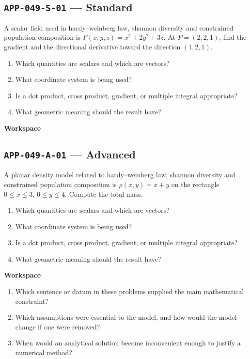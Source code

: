 \documentclass[11pt]{book}
\newcommand{\pid}[1]{\texttt{#1}}
\newcommand{\workspace}{\par\vspace{0.7in}\hrulefill\par\vspace{0.55in}\hrulefill\par}
\begin{document}
\subsection*{\pid{APP-049-S-01} — Standard}
\begin{problembox}
A scalar field used in hardy–weinberg law, shannon diversity and constrained population composition is $F(x,y,z)=x^2+2y^2+3z$. At $P=(2,2,1)$, find the gradient and the directional derivative toward the direction $(1,2,1)$.
\end{problembox}
\begin{promptbox}\begin{enumerate}
\item Which quantities are scalars and which are vectors?
\item What coordinate system is being used?
\item Is a dot product, cross product, gradient, or multiple integral appropriate?
\item What geometric meaning should the result have?
\end{enumerate}\end{promptbox}
\textbf{Workspace}\workspace
{}
\subsection*{\pid{APP-049-A-01} — Advanced}
\begin{problembox}
A planar density model related to hardy–weinberg law, shannon diversity and constrained population composition is $\rho(x,y)=x+y$ on the rectangle $0\le x\le 3$, $0\le y\le 4$. Compute the total mass.
\end{problembox}
\begin{promptbox}\begin{enumerate}
\item Which quantities are scalars and which are vectors?
\item What coordinate system is being used?
\item Is a dot product, cross product, gradient, or multiple integral appropriate?
\item What geometric meaning should the result have?
\end{enumerate}\end{promptbox}
\textbf{Workspace}\workspace
\begin{reflectionbox}\begin{enumerate}
\item Which sentence or datum in these problems supplied the main mathematical constraint?
\item Which assumptions were essential to the model, and how would the model change if one were removed?
\item When would an analytical solution become inconvenient enough to justify a numerical method?
\end{enumerate}\end{reflectionbox}
\end{document}
